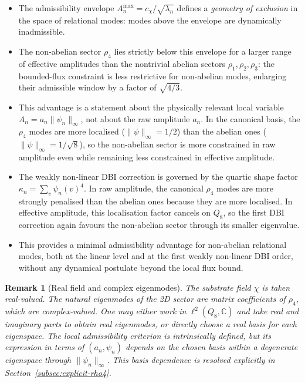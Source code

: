 \documentclass[11pt,a4paper]{article}
\newtheorem{remark}{Remark}
\begin{document}
  \begin{itemize}
    \item The admissibility envelope $A_n^{\max} = c_\chi / \sqrt{\lambda_n}$ defines a
    \emph{geometry of exclusion} in the space of relational modes: modes above the
    envelope are dynamically inadmissible.
    \item The non-abelian sector $\rho_4$ lies strictly below this envelope for a larger
    range of effective amplitudes than the nontrivial abelian sectors
    $\rho_1, \rho_2, \rho_3$: the bounded-flux constraint is less restrictive for
    non-abelian modes, enlarging their admissible window by a factor of $\sqrt{4/3}$.
    \item This advantage is a statement about the physically relevant local variable
    $A_n = a_n \|\psi_n\|_\infty$, not about the raw amplitude $a_n$.
    In the canonical basis, the $\rho_4$ modes are more localised
    ($\|\psi\|_\infty = 1/2$) than the abelian ones
    ($\|\psi\|_\infty = 1/\sqrt{8}$), so the non-abelian sector is more constrained
    in raw amplitude even while remaining less constrained in effective amplitude.
    \item The weakly non-linear DBI correction is governed by the quartic shape factor
    $\kappa_n = \sum_v \psi_n(v)^4$.
    In raw amplitude, the canonical $\rho_4$ modes are more strongly penalised than
    the abelian ones because they are more localised.
    In effective amplitude, this localisation factor cancels on $Q_8$, so the first
    DBI correction again favours the non-abelian sector through its smaller
    eigenvalue.
    \item This provides a minimal admissibility advantage for non-abelian relational
    modes, both at the linear level and at the first weakly non-linear DBI order,
    without any dynamical postulate beyond the local flux bound.
  \end{itemize}

  \begin{remark}[Real field and complex eigenmodes]
      The substrate field $\chi$ is taken real-valued.
      The natural eigenmodes of the 2D sector are matrix coefficients of $\rho_4$,
      which are complex-valued.
      One may either work in $\ell^2(Q_8, \mathbb{C})$ and take real and imaginary parts to
      obtain real eigenmodes, or directly choose a real basis for each eigenspace.
      The local admissibility criterion is intrinsically defined, but its expression in
      terms of $(a_n,\psi_n)$ depends on the chosen basis within a degenerate eigenspace
      through $\|\psi_n\|_\infty$.
      This basis dependence is resolved explicitly in
      Section~\ref{subsec:explicit-rho4}.
  \end{remark}
\end{document}
